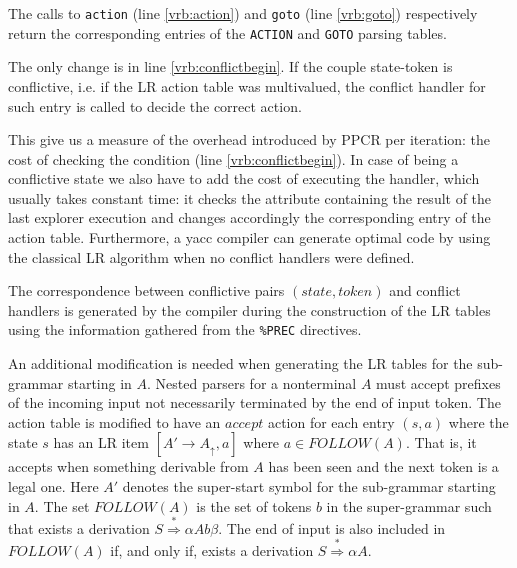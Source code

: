 The calls to \verb|action| (line \ref{vrb:action}) and \verb|goto| (line \ref{vrb:goto}) 
respectively return the corresponding entries
of the \verb|ACTION| and \verb|GOTO| parsing tables.

The only change is in line \ref{vrb:conflictbegin}.
If the couple state-token is conflictive, i.e. if the LR action table was multivalued, the 
conflict handler for such entry is called to decide the correct action. 

This give us a measure 
of the overhead introduced by PPCR per iteration: the cost of checking the condition (line \ref{vrb:conflictbegin}). In case 
of being a conflictive state we also have to add the cost of executing the handler, 
which usually takes constant time: it checks the attribute containing the
result of the last explorer execution and changes accordingly the corresponding entry of the action table. 
Furthermore, a yacc compiler can generate optimal code by using
the classical LR algorithm when no conflict handlers were defined.

The correspondence between conflictive pairs $(state, token)$ 
and conflict handlers
is generated by the compiler during the construction of the LR tables using the information gathered from
the \verb|%PREC| directives.

An additional modification is needed when generating the LR tables for the sub-grammar starting in $A$.
Nested parsers for a nonterminal $A$ must accept prefixes  of the incoming input not necessarily
terminated by the end of input token. The action table is modified to have an $accept$ action 
for each entry $(s, a)$
where the state $s$ has an LR item $[A' \rightarrow A_\uparrow , a]$ where $a \in FOLLOW(A)$.
That is, it accepts when something derivable from $A$ has been seen and the next token is a legal one.
Here $A'$ denotes the super-start symbol for the sub-grammar starting in $A$. The set $FOLLOW(A)$ 
is the set of tokens $b$ in the super-grammar such that exists a derivation 
$S  \stackrel{*}{\Longrightarrow}  \alpha A b \beta$.
The end of input is also included in $FOLLOW(A)$ if, and only if,
exists a derivation $S \stackrel{*}{\Longrightarrow} \alpha A$.

